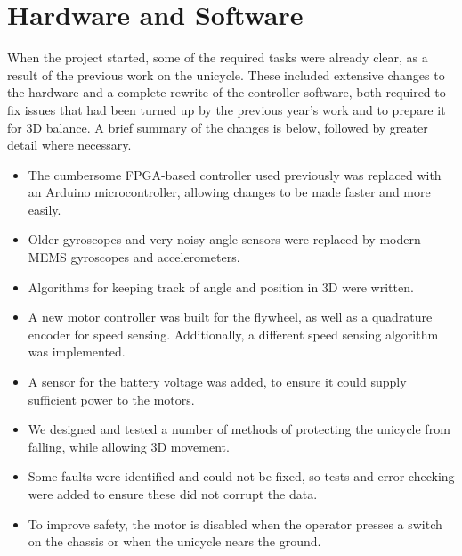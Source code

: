 \documentclass{IIBproject}
\begin{document}
\section{Hardware and Software}

When the project started, some of the required tasks were already clear, as a
result of the previous work on the unicycle. These included extensive changes
to the hardware and a complete rewrite of the controller software, both
required to fix issues that had been turned up by the previous year's work
and to prepare it for 3D balance. A brief summary of the changes is below,
followed by greater detail where necessary.

\begin{itemize}

  \item The cumbersome FPGA-based controller used previously was replaced with
    an Arduino microcontroller, allowing changes to be made faster and more
    easily.

  \item Older gyroscopes and very noisy angle sensors were replaced by modern
    MEMS gyroscopes and accelerometers.

  \item Algorithms for keeping track of angle and position in 3D were written.

  \item A new motor controller was built for the flywheel, as well as a
    quadrature encoder for speed sensing. Additionally, a different speed
    sensing algorithm was implemented.

  \item A sensor for the battery voltage was added, to ensure it could supply
    sufficient power to the motors.

  \item We designed and tested a number of methods of protecting the unicycle
    from falling, while allowing 3D movement.

  \item Some faults were identified and could not be fixed, so tests and
    error-checking were added to ensure these did not corrupt the data.

  \item To improve safety, the motor is disabled when the operator presses a
    switch on the chassis or when the unicycle nears the ground.

\end{itemize}
\end{document}
